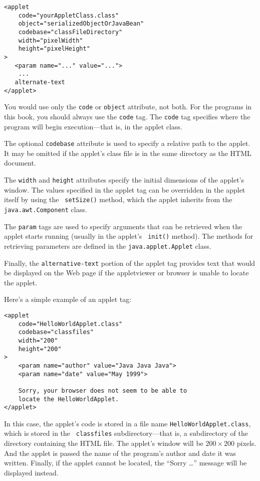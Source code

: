 \begin{jjjlisting}
\begin{lstlisting}
<applet
    code="yourAppletClass.class"
    object="serializedObjectOrJavaBean"
    codebase="classFileDirectory"
    width="pixelWidth"
    height="pixelHeight"
>
   <param name="..." value="...">
    ...
   alternate-text
</applet>
\end{lstlisting}
\end{jjjlisting}

\noindent You would use only the {\tt code} or {\tt object} attribute,
not both.  For the programs in this book, you should always use the
{\tt code} tag.  The {\tt code} tag specifies where the program
will begin execution---that is, in the applet class.

The optional {\tt codebase} attribute is used to specify a relative
path to the applet.  It may be omitted if the applet's class file is in
the same directory as the HTML document.

The {\tt width} and {\tt height} attributes specify the initial
dimensions of the applet's window.  The values specified in the applet
tag can be overridden in the applet itself by using the {\tt
setSize()} method, which the applet inherits from the {\tt
java.awt.Component} class.

The {\tt param} tags are used to specify arguments that can be
retrieved when the applet starts running (usually in the applet's {\tt
init()} method).  The methods for retrieving parameters are defined
in the {\tt java.applet.Applet} class.

Finally, the {\tt alternative-text} portion of the applet tag provides
text that would be displayed on the Web page if the appletviewer or
browser is unable to locate the applet.

Here's a simple example of an applet tag:

\begin{jjjlisting}
\begin{lstlisting}
<applet
    code="HelloWorldApplet.class"
    codebase="classfiles"
    width="200"
    height="200"
>
    <param name="author" value="Java Java Java">
    <param name="date" value="May 1999">

    Sorry, your browser does not seem to be able to
    locate the HelloWorldApplet.
</applet>
\end{lstlisting}
\end{jjjlisting}

\noindent In this case, the applet's code is stored in a
file name {\tt HelloWorld\-Applet.class}, which is stored in the {\tt
classfiles} subdirectory---that is, a subdirectory of the directory
containing the HTML file.   The applet's window will be $200 \times 200$
pixels.  And the applet is passed the name of the program's author and
date it was written.  Finally, if the applet cannot be located, the
``Sorry \dots '' message will be displayed instead.


